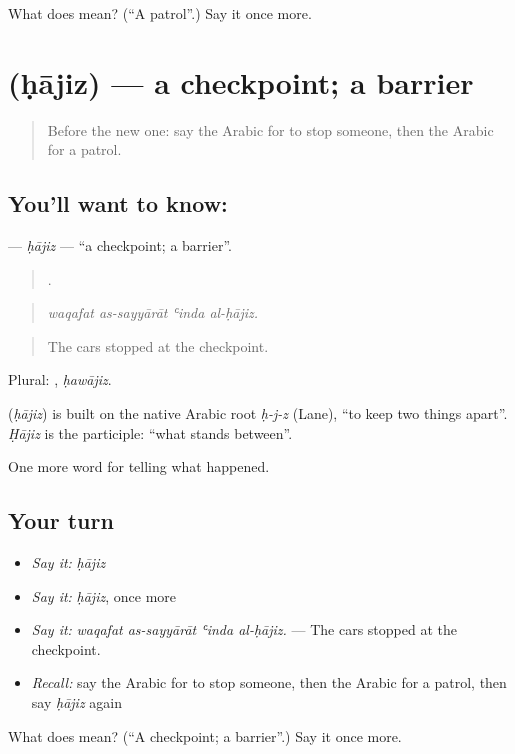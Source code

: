 \begin{tcolorbox}[breakable,colback=teal!4,colframe=teal!35!black,title={Before you move on}]
What does  mean? (\textquotedblleft{}A patrol\textquotedblright{}.) Say it once more.
\end{tcolorbox}
\section[\texorpdfstring{\ar{حاجز} (ḥājiz)}{حاجز (ḥājiz)}]{ (ḥājiz) — a checkpoint; a barrier}

\label{lesson:AR-C317-hajiz}



\begin{quote}
Before the new one: say the Arabic for to stop someone, then the Arabic for a patrol.
\end{quote}

\subsection*{You'll want to know: }
\textbf{} — \emph{ḥājiz} — \textquotedblleft{}a checkpoint; a barrier\textquotedblright{}.

\begin{quote}
   .
\end{quote}

\begin{quote}
\emph{waqafat as-sayyārāt ʿinda al-ḥājiz.}
\end{quote}

\begin{quote}
The cars stopped at the checkpoint.
\end{quote}

Plural: , \emph{ḥawājiz}.

\begin{cousinweb}
\textbf{} (\emph{ḥājiz}) is built on the native Arabic root \emph{ḥ-j-z} (Lane), \textquotedblleft{}to keep two things apart\textquotedblright{}. \emph{Ḥājiz} is the participle: \textquotedblleft{}what stands between\textquotedblright{}.
\end{cousinweb}

\begin{grammarlens}[title={What you've built}]
One more word for telling what happened.
\end{grammarlens}

\subsection*{Your turn}
\begin{itemize}
\raggedright
  \item \emph{Say it:} \emph{ḥājiz}
  \item \emph{Say it:} \emph{ḥājiz}, once more
  \item \emph{Say it:} \emph{waqafat as-sayyārāt ʿinda al-ḥājiz.} — The cars stopped at the checkpoint.
  \item \emph{Recall:} say the Arabic for to stop someone, then the Arabic for a patrol, then say \emph{ḥājiz} again
\end{itemize}

\begin{tcolorbox}[breakable,colback=teal!4,colframe=teal!35!black,title={Before you move on}]
What does  mean? (\textquotedblleft{}A checkpoint; a barrier\textquotedblright{}.) Say it once more.
\end{tcolorbox}

